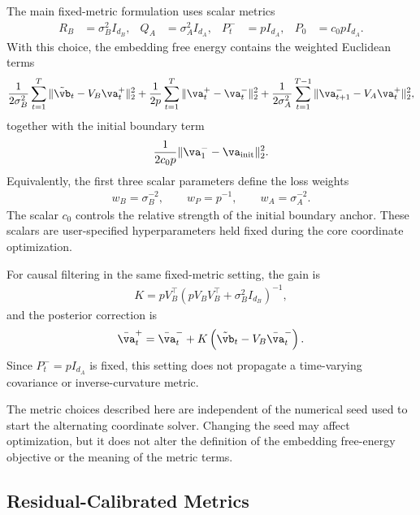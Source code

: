 \documentclass[twoside,11pt]{article}
\begin{document}
The main fixed-metric formulation uses scalar metrics
\begin{align}
R_B
&=
\sigma_B^2 I_{d_B},
&
Q_A
&=
\sigma_A^2 I_{d_A},
&
P_t^-
&=
p I_{d_A},
&
P_0
&=
c_0p I_{d_A}.
\label{eq:app_fixed_scalar_metrics}
\end{align}
With this choice, the embedding free energy contains the weighted
Euclidean terms
\begin{align}
\frac{1}{2\sigma_B^2}
\sum_{t=1}^T
\|\tilde{\vb}_t - V_B\va_t^+\|_2^2
+
\frac{1}{2p}
\sum_{t=1}^T
\|\va_t^+ - \va_t^-\|_2^2
+
\frac{1}{2\sigma_A^2}
\sum_{t=1}^{T-1}
\|\va_{t+1}^- - V_A\va_t^+\|_2^2,
\label{eq:app_fixed_metric_weighted_objective}
\end{align}
together with the initial boundary term
\begin{align}
\frac{1}{2c_0p}
\|\va_1^- - \va_{\mathrm{init}}\|_2^2.
\label{eq:app_fixed_metric_initial_term}
\end{align}
Equivalently, the first three scalar parameters define the loss weights
\begin{align}
w_B=\sigma_B^{-2},
\qquad
w_P=p^{-1},
\qquad
w_A=\sigma_A^{-2}.
\end{align}
The scalar $c_0$ controls the relative strength of the initial boundary
anchor. These scalars are user-specified hyperparameters held fixed
during the core coordinate optimization.

For causal filtering in the same fixed-metric setting, the gain is
\begin{align}
K
=
p V_B^\top
\left(
p V_BV_B^\top+\sigma_B^2 I_{d_B}
\right)^{-1},
\label{eq:app_fixed_metric_gain}
\end{align}
and the posterior correction is
\begin{align}
\bar{\va}_t^+
=
\bar{\va}_t^-
+
K
\left(
\tilde{\vb}_t - V_B\bar{\va}_t^-
\right).
\label{eq:app_fixed_metric_test_update}
\end{align}
Since $P_t^-=pI_{d_A}$ is fixed, this setting does not propagate a
time-varying covariance or inverse-curvature metric.

The metric choices described here are independent of the numerical seed
used to start the alternating coordinate solver. Changing the seed may
affect optimization, but it does not alter the definition of the
embedding free-energy objective or the meaning of the metric terms.

\subsection{Residual-Calibrated Metrics}
\end{document}
